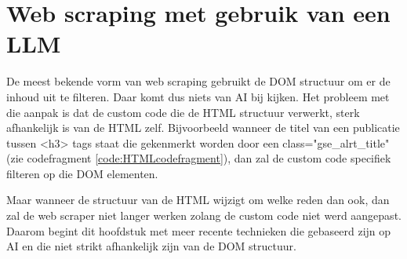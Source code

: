 \section{Web scraping met gebruik van een LLM }
De meest bekende vorm van web scraping gebruikt de DOM structuur om er de inhoud uit te filteren. Daar komt dus niets van AI bij kijken. Het probleem met die aanpak is dat de custom code die de HTML structuur verwerkt, sterk afhankelijk is van de HTML zelf. Bijvoorbeeld wanneer de titel van een publicatie tussen <h3> tags staat die gekenmerkt worden door een class="gse\_alrt\_title" (zie codefragment \ref{code:HTMLcodefragment}), dan zal de custom code specifiek filteren op die DOM elementen.
Maar wanneer de structuur van de HTML wijzigt om welke reden dan ook, dan zal de web scraper niet langer werken zolang de custom code niet werd aangepast.\\
Daarom begint dit hoofdstuk met meer recente technieken die gebaseerd zijn op AI en die niet strikt afhankelijk zijn van de DOM structuur.
